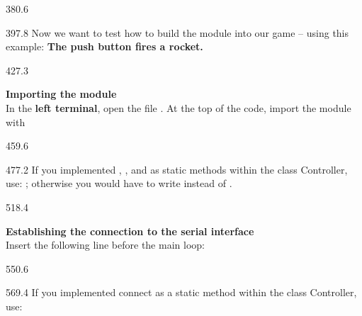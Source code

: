 \documentclass{aslab}
\begin{document}
\begin{region}{380.6}
\end{region}

\begin{region}[pitch=14.2]{397.8}
Now we want to test how to build the module  into our
game -- using this example: \textbf{The push button fires a rocket.}
\end{region}

\begin{region}[pitch=14.3]{427.3}
\begin{tasks}
\item \textbf{Importing the module}\\
  In the \textbf{left terminal}, open the file . At the
  top of the code, import the module with
\end{tasks}
\end{region}

\begin{region}[x=74.7,right=0]{459.6}
\end{region}

\begin{region}[x=74.7,right=0,pitch=13.5]{477.2}
If you implemented , , and  as
static methods within the class Controller, use:
; otherwise you would have to write
 instead of .
\end{region}

\begin{region}[pitch=13.3]{518.4}
\begin{tasks}[start=2]
\item \textbf{Establishing the connection to the serial interface}\\
  Insert the following line before the main loop:
\end{tasks}
\end{region}

\begin{region}[x=74.7,right=0]{550.6}
\end{region}

\begin{region}[x=74.7,right=0,pitch=13.4]{569.4}
If you implemented connect as a static method within the class Controller,
use:\\
\end{region}
\end{document}
